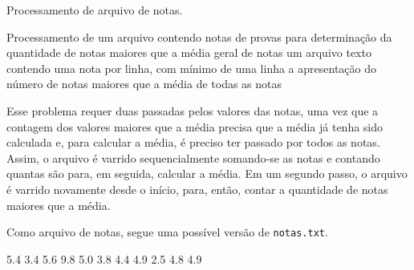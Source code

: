 \documentclass[
  11pt,
  a4paper,
]{scrbook}
\newenvironment{Shaded}{\begin{snugshade}}{\end{snugshade}}
\newcommand{\NormalTok}[1]{#1}
\begin{document}
\begin{algorithm}[H]
\caption{\label{alg-notas-maiores-que-a-media}Processamento de arquivo
de notas.}
\begingroup%

\begin{algorithmic}
    \Description Processamento de um arquivo contendo notas de provas para determinação da quantidade de notas maiores que a média geral de notas
    \Require um arquivo texto contendo uma nota por linha, com mínimo de uma linha
    \Ensure a apresentação do número de notas maiores que a média de todas as notas
    \Statex{}
    \EndWhile
    \Statex
    \EndWhile
    \Statex
\end{algorithmic}

\endgroup
\end{algorithm}

Esse problema requer duas passadas pelos valores das notas, uma vez que
a contagem dos valores maiores que a média precisa que a média já tenha
sido calculada e, para calcular a média, é preciso ter passado por todos
as notas. Assim, o arquivo é varrido sequencialmente somando-se as notas
e contando quantas são para, em seguida, calcular a média. Em um segundo
passo, o arquivo é varrido novamente desde o início, para, então, contar
a quantidade de notas maiores que a média.

Como arquivo de notas, segue uma possível versão de \texttt{notas.txt}.

\begin{Shaded}
\begin{Highlighting}[]
\NormalTok{5.4}
\NormalTok{3.4}
\NormalTok{5.6}
\NormalTok{9.8}
\NormalTok{5.0}
\NormalTok{3.8}
\NormalTok{4.4}
\NormalTok{4.9}
\NormalTok{2.5}
\NormalTok{4.8}
\NormalTok{4.9}
\end{Highlighting}
\end{Shaded}
\end{document}
